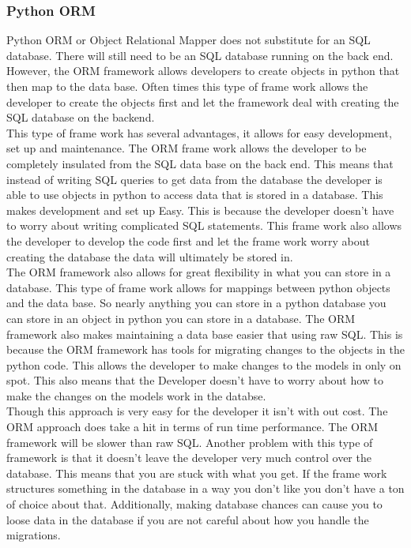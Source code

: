 \documentclass[letterpaper,10pt]{article}
\begin{document}
		\subsubsection{Python ORM}
				Python ORM or Object Relational Mapper does not substitute for an SQL database. There will still need to be an SQL database running on the back end. However, the ORM framework allows developers to create objects in python that then map to the data base. Often times this type of frame work allows the developer to create the objects first and let the framework deal with creating the SQL database on the backend.\\
				This type of frame work has several advantages, it allows for easy development, set up and maintenance. The ORM frame work allows the developer to be completely insulated from the SQL data base on the back end. This means that instead of writing SQL queries to get data from the database the developer is able to use objects in python to access data that is stored in a database. This makes development and set up Easy. This is because the developer doesn't have to worry about writing complicated SQL statements. This frame work also allows the developer to develop the code first and let the frame work worry about creating the database the data will ultimately be stored in.\\
				The ORM framework also allows for great flexibility in what you can store in a database. This type of frame work allows for mappings between python objects and the data base. So nearly anything you can store in a python database you can store in an object in python you can store in a database.
				The ORM framework also makes maintaining a data base easier that using raw SQL. This is because the ORM framework has tools for migrating changes to the objects in the python code. This allows the developer to make changes to the models in only on spot. This also means that the Developer doesn't have to worry about how to make the changes on the models work in the databse.\\
				Though this approach is very easy for the developer it isn't with out cost. The ORM approach does take a hit in terms of run time performance. The ORM framework will be slower than raw SQL. Another problem with this type of framework is that it doesn’t leave the developer very much control over the database. This means that you are stuck with what you get. If the frame work structures something in the database in a way you don't like you don't have a ton of choice about that. Additionally, making database chances can cause you to loose data in the database if you are not careful about how you handle the migrations.\\
				
\end{document}
